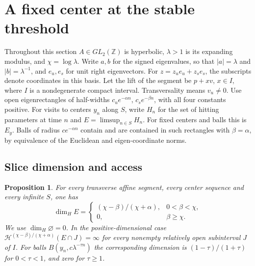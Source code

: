 \documentclass[11pt,a4paper,reqno]{amsart}
\newtheorem{proposition}[theorem]{Proposition}
\theoremstyle{definition}
\theoremstyle{remark}
\numberwithin{equation}{section}
\begin{document}
\section{A fixed center at the stable threshold}\label{sec:critical}

Throughout this section \(A\in GL_2(\mathbb Z)\) is hyperbolic,
\(\lambda>1\) is its expanding modulus, and \(\chi=\log\lambda\).
Write \(a,b\) for the signed eigenvalues, so that
\(|a|=\lambda\) and \(|b|=\lambda^{-1}\), and \(e_u,e_s\) for unit right
eigenvectors. For \(z=z_u e_u+z_s e_s\), the subscripts denote
coordinates in this basis. Let the lift of the segment be \(p+xv\),
\(x\in I\), where \(I\) is a nondegenerate compact interval.
Transversality means \(v_u\ne0\). Use open eigenrectangles of
half-widths \(c_u e^{-\alpha n}\), \(c_s e^{-\beta n}\), with all
four constants positive. For visits to centers \(y_n\) along \(S\),
write \(H_n\) for the set of hitting parameters at time \(n\) and
\(E=\limsup_{n\in S} H_n\). For fixed centers and balls this is \(E_y\).
Balls of radius \(c e^{-\alpha n}\) contain and are contained in
such rectangles with \(\beta=\alpha\), by equivalence of the
Euclidean and eigen-coordinate norms.

\subsection{Slice dimension and access}

\begin{proposition}\label{prop:transverse-slices}
For every transverse affine segment, every center sequence and every
infinite \(S\), one has
\[
\dim_H E=
\begin{cases}
(\chi-\beta)/(\chi+\alpha),&0<\beta<\chi,\\
0,&\beta\ge\chi .
\end{cases}
\]
We use \(\dim_H\varnothing=0\). In the positive-dimensional case
\(\mathcal H^{(\chi-\beta)/(\chi+\alpha)}(E\cap J)=\infty\) for every
nonempty relatively open subinterval \(J\) of \(I\).
For balls \(B(y_n,c\lambda^{-\tau n})\) the corresponding dimension
is \((1-\tau)/(1+\tau)\) for \(0<\tau<1\), and zero for \(\tau\ge1\).
\end{proposition}
\end{document}
